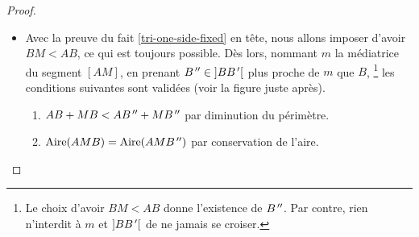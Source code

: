 \begin{proof}
\begin{itemize}
		\item Avec la preuve du fait \ref{tri-one-side-fixed} en tête, nous allons imposer d'avoir $BM < AB$, ce qui est toujours possible.
		Dès lors, nommant $m$ la médiatrice du segment $[AM]$,
		en prenant $B^{\,\prime\prime} \in {]B B^{\,\prime}[}$ plus proche de $m$ que $B$,%
		\footnote{
		    Le choix d'avoir $BM < AB$ donne l'existence de $B^{\,\prime\prime}$.
		    Par contre, rien n'interdit à $m$ et $]B B^{\,\prime}[$ de ne jamais se croiser.
		}
		les conditions suivantes sont validées (voir la figure  juste après).
		\begin{enumerate}
			\item $AB + MB < A B^{\,\prime\prime} + M B^{\,\prime\prime}$ par diminution du périmètre.

			\item $\mathrm{Aire}(AMB) = \mathrm{Aire}(AM B^{\,\prime\prime})$ par conservation de l'aire.


\end{enumerate}
\end{itemize}
\end{proof}
